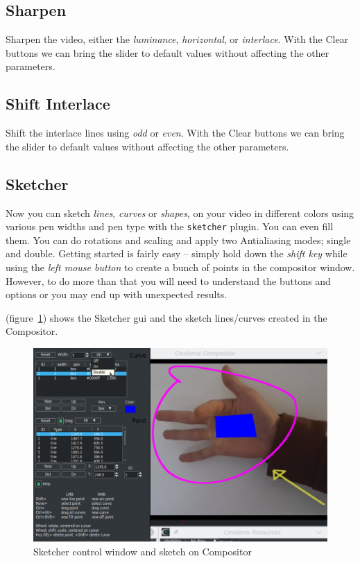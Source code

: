 \subsection{Sharpen}%
\label{sub:Sharpen}

Sharpen the video, either the \textit{luminance}, \textit{horizontal}, or \textit{interlace}. With the Clear buttons we can bring the slider to default values without affecting the other parameters.

\subsection{Shift Interlace}%
\label{sub:shift_interlace}

Shift the interlace lines using \textit{odd} or \textit{even}. With the Clear buttons we can bring the slider to default values without affecting the other parameters.

\subsection{Sketcher}%
\label{sub:Sketcher}

Now you can sketch \textit{lines}, \textit{curves} or \textit{shapes}, on your video in different colors using various pen widths and pen type with the \texttt{sketcher} plugin. You can even fill them. You can do rotations and scaling and apply two Antialiasing modes; single and double. Getting started is fairly easy -- simply hold down the \textit{shift key} while using the \textit{left mouse button} to create a bunch of points in the compositor window. However, to do more than that you will need to understand the buttons and options or you may end up with unexpected results.

(figure~\ref{fig:sketcher}) shows the Sketcher gui and the sketch lines/curves created in the Compositor.

\begin{figure}[hbtp]
    \centering
    \includegraphics[width=1.0\linewidth]{images/sketcher.png}
    \caption{Sketcher control window and sketch on Compositor}
    \label{fig:sketcher}
\end{figure}

